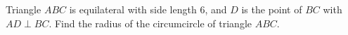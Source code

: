 Triangle $ABC$ is equilateral with side length $6$, and $D$ is the point of $BC$ with $AD\perp BC$. Find the radius of the circumcircle of triangle $ABC$.
